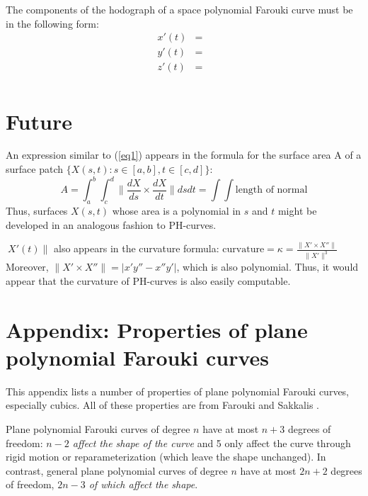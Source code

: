 \begin{lemma}
The components of the hodograph of a space polynomial Farouki
curve must be in the following form:
\begin{eqnarray*}
	x'(t) & = &   \\
	y'(t) & = &   \\
	z'(t) & = &   \\
\end{eqnarray*}
\end{lemma}


\section{Future}

\begin{rmk}
An expression similar to (\ref{eq1}) 
appears in the formula for the surface area A
of a surface patch $\{X(s,t):s\in [a,b], t \in [c,d] \}$:
\[ A = \int_a^b \int_c^d \| \frac{dX}{ds} \times \frac{dX}{dt} \| ds dt 
     = \int \int \mbox{length of normal} \]
Thus, surfaces $X(s,t)$
whose area is a polynomial in $s$ and $t$ 
might be developed in an analogous fashion to PH-curves.
\end{rmk}

\begin{rmk}
$\ X'(t) \|$ also appears in the curvature formula:
$\mbox{curvature} = \kappa = \frac{\| X' \times X'' \|}{\| X' \|^3}$
Moreover, $\| X' \times X'' \| = |x'y'' - x''y'|$,
which is also polynomial.
Thus, it would appear that the curvature of PH-curves is also
easily computable.
\end{rmk}


\section{Appendix: Properties of plane polynomial Farouki curves}

This appendix lists a number of properties of plane 
polynomial Farouki curves, especially cubics.
All of these properties are from Farouki and Sakkalis \cite{FS90}.

\begin{prop} 
\label{prop:f1}
Plane polynomial Farouki curves of degree $n$ have at most
$n+3$ degrees of freedom: {\em $n-2$ affect the shape
of the curve} and 5 only affect the curve through rigid motion
or reparameterization (which leave the shape unchanged).
In contrast, general plane polynomial curves of degree $n$
have at most $2n+2$ degrees of freedom, {\em $2n-3$ of which 
affect the shape}.
\end{prop}

